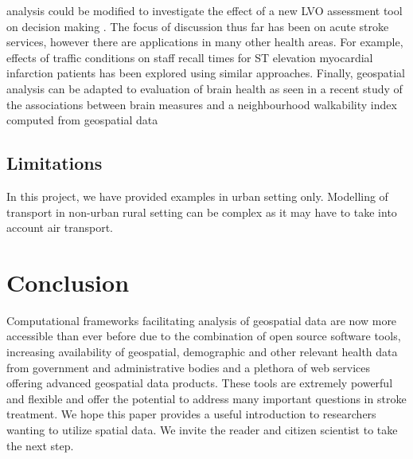 \documentclass[utf8]{frontiersHLTH}
\begin{document}
analysis could be modified to investigate the effect of a new LVO assessment tool on decision making \cite{10.3389/fneur.2019.00130}. The focus of discussion thus far has been on acute stroke services, however there are applications in many other health areas. For example, effects of traffic conditions on staff recall times for ST elevation myocardial infarction patients has been explored using similar approaches\cite{10.3389/fcvm.2017.00089}. Finally, geospatial analysis can be adapted to evaluation of brain health as seen in a recent study of the associations between brain measures and a neighbourhood walkability index computed from geospatial data \cite{cerin2017associations} 

\subsection{Limitations} In this project, we have provided examples in urban setting only. Modelling of transport in non-urban rural setting can be complex as it may have to take into account air transport.

\section{Conclusion} 
Computational frameworks facilitating analysis of geospatial data are now more accessible than ever before due to the combination of open source software tools, increasing availability of geospatial, demographic and other relevant health data from government and administrative bodies and a plethora of web services offering advanced geospatial data products. These tools are extremely powerful and flexible and offer the potential to address many important questions in stroke treatment. We hope this paper provides a useful introduction to researchers wanting to utilize spatial data. We invite the reader and citizen scientist to take the next step. 
\end{document}
